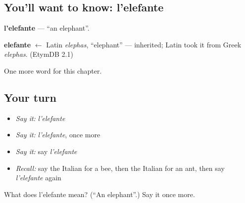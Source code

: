 \subsection*{You'll want to know: l'elefante}
\textbf{l'elefante} — \textquotedblleft{}an elephant\textquotedblright{}.

\begin{cousinweb}
\textbf{elefante} $\leftarrow$ Latin \emph{elephas}, \textquotedblleft{}elephant\textquotedblright{} — inherited; Latin took it from Greek \emph{elephas}. (EtymDB 2.1)
\end{cousinweb}

\begin{grammarlens}[title={What you've built}]
One more word for this chapter.
\end{grammarlens}

\subsection*{Your turn}
\begin{itemize}
\raggedright
  \item \emph{Say it:} \emph{l'elefante}
  \item \emph{Say it:} \emph{l'elefante}, once more
  \item \emph{Say it:} say \emph{l'elefante}
  \item \emph{Recall:} say the Italian for a bee, then the Italian for an ant, then say \emph{l'elefante} again
\end{itemize}

\begin{tcolorbox}[breakable,colback=teal!4,colframe=teal!35!black,title={Before you move on}]
What does l'elefante mean? (\textquotedblleft{}An elephant\textquotedblright{}.) Say it once more.
\end{tcolorbox}
